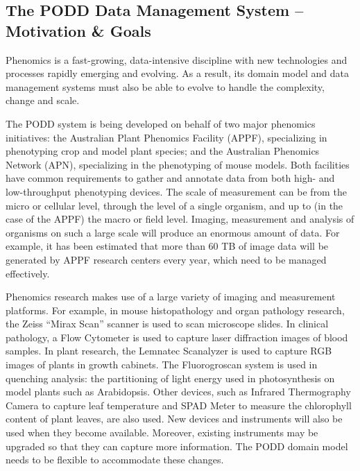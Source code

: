 \documentclass{elsarticle}
\begin{document}
\subsection{The PODD Data Management System -- Motivation \& Goals}
Phenomics is a fast-growing, data-intensive discipline
with new technologies and processes rapidly emerging
and evolving. As a result, its domain model and data
management systems must also be able to evolve to handle
the complexity, change and scale.

The PODD system is being developed on behalf of two major phenomics
initiatives: the Australian Plant Phenomics Facility (APPF),
specializing in phenotyping crop and model plant species; and the
Australian Phenomics Network (APN), specializing in the
phenotyping of mouse models. Both facilities have common
requirements to gather and annotate data from both high- and
low-throughput phenotyping devices. The scale of measurement can be
from the micro or cellular level, through the level of a single
organism, and up to (in the case of the APPF) the macro or field
level. Imaging, measurement and analysis of organisms on such a large
scale will produce an enormous amount of data.
For example, it has been estimated that more than
60 TB of image data will be generated by APPF research centers
every year, which need to be managed effectively.

Phenomics research makes use of a large variety of imaging and
measurement platforms. For example, in mouse histopathology and
organ pathology research, the Zeiss ``Mirax Scan'' scanner is used
to scan microscope slides. In clinical pathology, a Flow Cytometer
is used to capture laser diffraction images of blood samples. In
plant research, the Lemnatec Scanalyzer is used to capture RGB
images of plants in growth cabinets. The Fluorogroscan system is
used in quenching analysis: the partitioning of light energy used in
photosynthesis on model plants such as Arabidopsis. Other devices,
such as Infrared Thermography Camera to capture leaf temperature and
SPAD Meter to measure the chlorophyll content of plant leaves, are
also used. New devices and instruments will also be used when they
become available. Moreover, existing instruments may be upgraded so
that they can capture more information. The PODD domain model needs
to be flexible to accommodate these changes.
\end{document}
